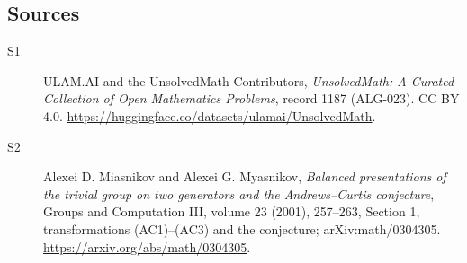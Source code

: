 \documentclass[11pt]{article}
\begin{document}
\subsection{Sources}
\begin{description}
\item[\hypertarget{source:1187:1}{S1}] ULAM.AI and the UnsolvedMath Contributors, \emph{UnsolvedMath: A Curated Collection of Open Mathematics Problems}, record 1187 (ALG-023). CC BY 4.0. \url{https://huggingface.co/datasets/ulamai/UnsolvedMath}.
\item[\hypertarget{source:1187:2}{S2}] Alexei D. Miasnikov and Alexei G. Myasnikov, \emph{Balanced presentations of the trivial group on two generators and the Andrews--Curtis conjecture}, Groups and Computation III, volume 23 (2001), 257--263, Section 1, transformations (AC1)--(AC3) and the conjecture; arXiv:math/0304305. \url{https://arxiv.org/abs/math/0304305}.
\end{description}
\label{end:1187}
\end{document}
